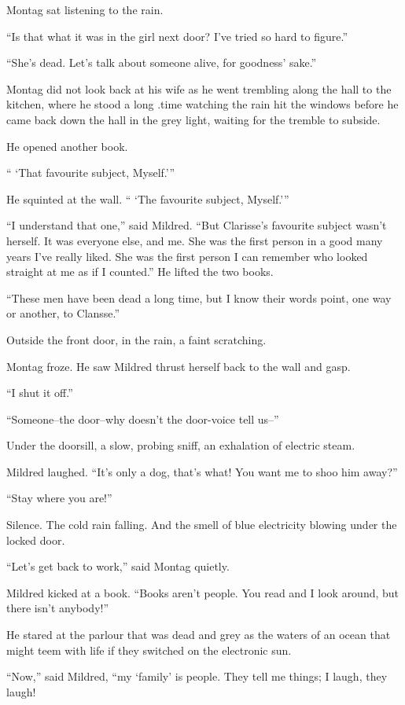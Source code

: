 \documentclass[11pt,openany]{book}
\begin{document}
Montag sat listening to the rain.

``Is that what it was in the girl next door? I've tried so hard to figure.''

``She's dead. Let's talk about someone alive, for goodness' sake.''

Montag did not look back at his wife as he went trembling along the hall to the kitchen, where he stood a long .time watching the rain hit the windows before he came back down the hall in the grey light, waiting for the tremble to subside.

He opened another book.

`` `That favourite subject, Myself.'''

He squinted at the wall. `` `The favourite subject, Myself.'''

``I understand that one,'' said Mildred. ``But Clarisse's favourite subject wasn't herself. It was everyone else, and me. She was the first person in a good many years I've really liked. She was the first person I can remember who looked straight at me as if I counted.'' He lifted the two books.

``These men have been dead a long time, but I know their words point, one way or another, to Clansse.''

Outside the front door, in the rain, a faint scratching.

Montag froze. He saw Mildred thrust herself back to the wall and gasp.

``I shut it off.''

``Someone--the door--why doesn't the door-voice tell us--''

Under the doorsill, a slow, probing sniff, an exhalation of electric steam.

Mildred laughed. ``It's only a dog, that's what! You want me to shoo him away?''

``Stay where you are!''

Silence. The cold rain falling. And the smell of blue electricity blowing under the locked door.

``Let's get back to work,'' said Montag quietly.

Mildred kicked at a book. ``Books aren't people. You read and I look around, but there isn't anybody!''

He stared at the parlour that was dead and grey as the waters of an ocean that might teem with life if they switched on the electronic sun.

``Now,'' said Mildred, ``my `family' is people. They tell me things; I laugh, they laugh!
\end{document}

